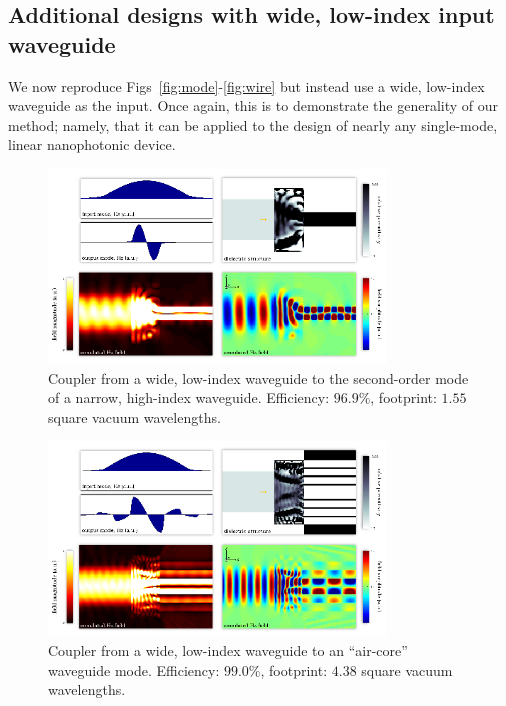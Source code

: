\documentclass[letterpaper,10pt]{article}
\begin{document}
\begin{appendix}
\section{Additional designs with wide, low-index input waveguide}
We now reproduce Figs~\ref{fig:mode}-\ref{fig:wire}
    but instead use a wide, low-index waveguide as the input.
Once again, this is to demonstrate the generality of our method;
    namely, that it can be applied to the design of nearly any
    single-mode, linear nanophotonic device.
\begin{figure}[h!]
    \centering
    \includegraphics[width=0.8\textwidth]{12}
    \caption{
        Coupler from a wide, low-index waveguide to the
            second-order mode of a narrow, high-index waveguide.
        Efficiency: $96.9\%$,
        footprint: $1.55$ square vacuum wavelengths.
        }
\end{figure}
\begin{figure}[h!]
    \centering
    \includegraphics[width=0.8\textwidth]{13}
    \caption{
        Coupler from a wide, low-index waveguide to an 
            ``air-core'' waveguide mode.
        Efficiency: $99.0\%$,
        footprint: $4.38$ square vacuum wavelengths.
        }
\end{figure}
\begin{figure}[h!]

\end{figure}
\end{appendix}
\end{document}
